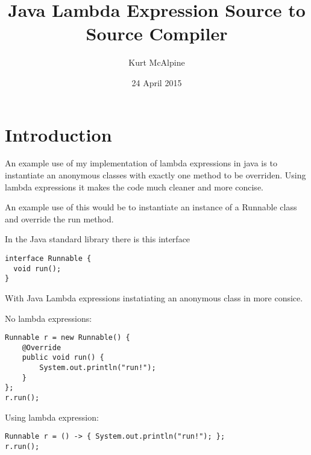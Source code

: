 \documentclass[twocolumn,notitlepage]{report}
\begin{document}
\title{Java Lambda Expression Source to Source Compiler}
\author{Kurt McAlpine}
\date{24 April 2015}
\maketitle

\section*{Introduction}
An example use of my implementation of lambda expressions in java is to
instantiate an anonymous classes with exactly one method to be overriden. Using
lambda expressions it makes the code much cleaner and more concise.

An example use of this would be to instantiate an instance of a Runnable class
and override the run method.\cite{Ierusalimschy:2007:EL:1238844.1238846}

In the Java standard library there is this interface
\begin{lstlisting}
interface Runnable {
  void run();
}
\end{lstlisting}
With Java Lambda expressions instatiating an anonymous class in more consice.

No lambda expressions:
\begin{lstlisting}
Runnable r = new Runnable() {
	@Override
	public void run() {
		System.out.println("run!");
	}
};
r.run();
\end{lstlisting}
Using lambda expression:
\begin{lstlisting}
Runnable r = () -> { System.out.println("run!"); };    	
r.run();
\end{lstlisting}



\end{document}
